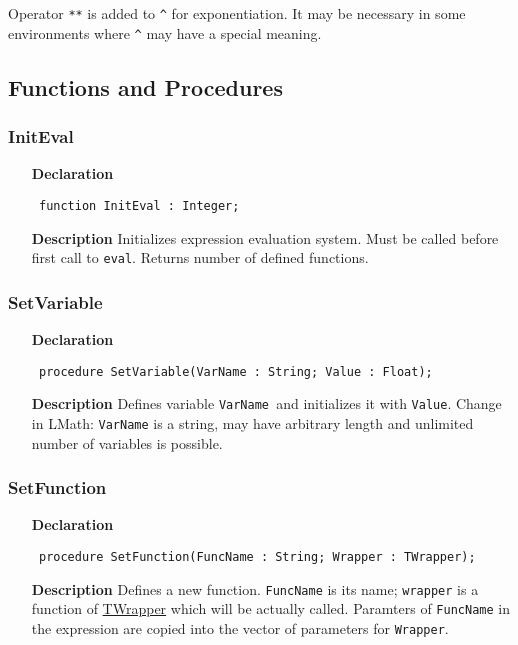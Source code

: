 \documentclass[12pt,a4paper,oneside]{report}
\newcommand{\lmath}[1]{   %
	\marginpar{\vspace{#1} 
		\begin{flushright}
			LMath
	\end{flushright} }
}
\newcommand{\declarationitem}[1]{\textbf{#1}}
\newcommand{\descriptiontitle}[1]{\textbf{#1}}
\newcommand{\code}[1]{\texttt{#1}}
\begin{document}
Operator \code{**} is added to \code{\^} for exponentiation. It may be necessary in some environments where \code{\^} may have a special meaning.


\subsection{Functions and Procedures}
\subsubsection{InitEval}
\label{ueval-InitEval}
\begin{itemize}\item[\declarationitem{Declaration}\hfill]
	\begin{flushleft}
		\code{
			function InitEval : Integer;}
	\end{flushleft}
	\item[\descriptiontitle{Description}]
Initializes expression evaluation system. Must be called before first call to \code{eval}. Returns number of defined functions. 
\end{itemize}
\subsubsection{SetVariable}
\label{ueval-SetVariable}
 \lmath{-6pt}
\begin{itemize}\item[\declarationitem{Declaration}\hfill]
	\begin{flushleft}
		\code{
			procedure SetVariable(VarName : String; Value : Float);}
	\end{flushleft}
	\item[\descriptiontitle{Description}]
Defines variable \code{VarName }and initializes it with \code{Value}. Change in LMath: \code{VarName} is a string, may have arbitrary length and unlimited number of variables is possible. 
\end{itemize}
\subsubsection{SetFunction}
\label{ueval-SetFunction}
\begin{itemize}\item[\declarationitem{Declaration}\hfill]
	\begin{flushleft}
		\code{
			procedure SetFunction(FuncName : String; Wrapper : TWrapper);}
	\end{flushleft}
	\item[\descriptiontitle{Description}]
Defines a new function. \code{FuncName} is its name; \code{wrapper} is a function of \hyperref[utypes-TWrapper]{TWrapper} which will be actually called. Paramters of \code{FuncName} in the expression are copied into the vector of parameters for \code{Wrapper}. 
\end{itemize}
\end{document}
